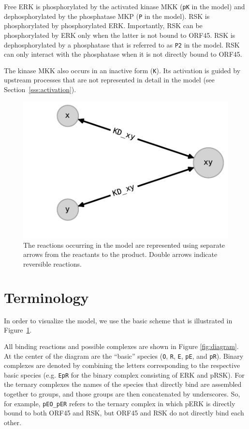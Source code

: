 \documentclass[12pt]{article}
\begin{document}
	Free ERK is phosphorylated by the activated kinase MKK (\texttt{pK} in the model)
	and dephosphorylated by the phosphatase MKP (\texttt{P} in the model). RSK is phosphorylated by phosphorylated ERK. Importantly, RSK can be phosphorylated by ERK only when the latter is not bound to ORF45. RSK is dephosphorylated by a phosphatase that is referred to as \texttt{P2} in the model. RSK can only interact with the phosphatase when it is not directly bound to ORF45.
	
	The kinase MKK also occurs in an inactive form (\texttt{K}).
	Its activation is guided by upstream processes that are not represented
	in detail in the model (see Section~\ref{sss:activation}).
	
	\begin{figure}[h!]
		\centering \includegraphics[width=0.5\linewidth]{../res/diagram_reaction_scheme}
		\caption{The reactions occurring in the model are represented using separate
			arrows from the reactants to the product. Double arrows indicate reversible
			reactions.}
		\label{fig:scheme} 
	\end{figure}
	
	
	\section{Terminology}
	
	In order to visualize the model, we use the basic scheme
	that is illustrated in Figure~\ref{fig:scheme}.
	
	All binding reactions and possible complexes are shown in Figure \ref{fig:diagram}. At the center of the diagram are the ``basic'' species (\texttt{O}, \texttt{R}, \texttt{E}, \texttt{pE}, and \texttt{pR}). Binary complexes are denoted by combining the letters corresponding to the respective
	basic species (e.g. \texttt{EpR} for the binary complex consisting
	of ERK and pRSK). For the ternary complexes the names of the species	that directly bind are assembled together to groups, and those groups are then concatenated by underscores. So, for example, \texttt{pEO\_pER} refers to the ternary complex in which pERK is directly bound to both ORF45 and RSK, but ORF45 and RSK do not directly bind each other.
	
\end{document}
